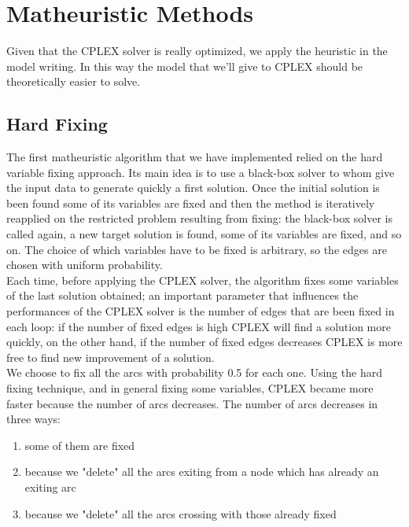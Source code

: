 
\chapter{Matheuristic Methods}
\label{chp:4-Matheuristics}
Given that the \textsc{CPLEX} solver is really optimized, we apply the heuristic in the model writing. In this way the model that we’ll give to \textsc{CPLEX} should be theoretically easier to solve.

\section{Hard Fixing}
The first matheuristic algorithm that we have implemented relied on the hard variable fixing approach. Its main idea is to use a black-box solver to whom give the input data to generate quickly a first solution. Once the initial solution is been found some of its variables are fixed and then the method is iteratively reapplied on the restricted problem resulting from fixing: the black-box solver is called again, a new target solution is found, some of its variables are fixed, and so on. The choice of which variables have to be fixed is arbitrary, so the edges are chosen with uniform probability.\\
Each time, before applying the \textsc{CPLEX} solver, the algorithm fixes some variables of the last solution obtained; an important parameter that influences the performances of the \textsc{CPLEX} solver is the number of edges that are been fixed in each loop: if the number of fixed edges is high \textsc{CPLEX} will find a solution more quickly, on the other hand, if the number of fixed edges decreases \textsc{CPLEX} is more free to find new improvement of a solution. \\
We choose to fix all the arcs with probability 0.5 for each one. 
Using the hard fixing technique, and in general fixing some variables, \textsc{CPLEX} became more faster because the number of arcs decreases. The number of arcs decreases in three ways: 
\begin{enumerate}
\item some of them are fixed
\item because we "delete" all the arcs exiting from a node which has already an exiting arc
\item because we "delete" all the arcs crossing with those already fixed 
\end{enumerate}
